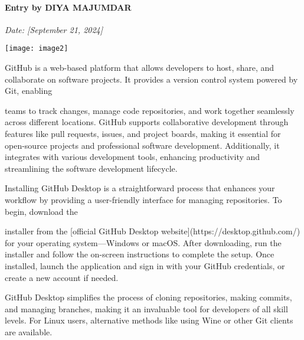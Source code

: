 \documentclass{article} %
\begin{document}
\noindent 
\paragraph{Entry by DIYA MAJUMDAR}

\noindent \textit{Date: [September 21, 2024]}

\noindent \textit{}

\noindent \textit{}

\noindent \texttt{[image: image2]}\textit{}

\noindent \textit{}

\noindent \textit{}

\noindent \textit{}

\noindent \textbf{}

\noindent GitHub is a web-based platform that allows developers to host, share, and collaborate on software projects. It provides a version control system powered by Git, enabling

\noindent teams to track changes, manage code repositories, and work together seamlessly across different locations. GitHub supports collaborative development through features like pull requests, issues, and project boards, making it essential for open-source projects and professional software development. Additionally, it integrates with various development tools, enhancing productivity and streamlining the software development lifecycle.

\noindent 

\noindent 

\noindent 

\noindent \textbf{}

Installing GitHub Desktop is a straightforward process that enhances your workflow by providing a user-friendly interface for managing repositories. To begin, download the

\noindent installer from the [official GitHub Desktop website](https://desktop.github.com/) for your operating system---Windows or macOS. After downloading, run the installer and follow the on-screen instructions to complete the setup. Once installed, launch the application and sign in with your GitHub credentials, or create a new account if needed.

\noindent GitHub Desktop simplifies the process of cloning repositories, making commits, and managing branches, making it an invaluable tool for developers of all skill levels. For Linux users, alternative methods like using Wine or other Git clients are available.
\end{document}
